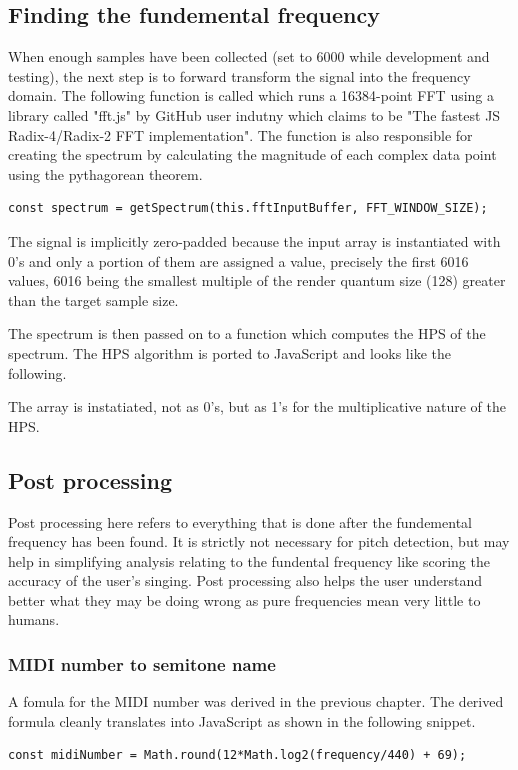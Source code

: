 \subsection{Finding the fundemental frequency}
When enough samples have been collected (set to 6000 while development and testing), the next step is to forward transform the signal into the frequency domain. The following function is called which runs a 16384-point FFT using a library called "fft.js" by GitHub user indutny which claims to be "The fastest JS Radix-4/Radix-2 FFT implementation". The function is also responsible for creating the spectrum by calculating the magnitude of each complex data point using the pythagorean theorem. 
\begin{lstlisting}[style=javascript]
    const spectrum = getSpectrum(this.fftInputBuffer, FFT_WINDOW_SIZE);
\end{lstlisting}
The signal is implicitly zero-padded because the input array is instantiated with 0's and only a portion of them are assigned a value, precisely the first 6016 values, 6016 being the smallest multiple of the render quantum size (128) greater than the target sample size.

The spectrum is then passed on to a function which computes the HPS of the spectrum. The HPS algorithm is ported to JavaScript and looks like the following. 

The array is instatiated, not as 0's, but as 1's for the multiplicative nature of the HPS.  

\subsection{Post processing}
Post processing here refers to everything that is done after the fundemental frequency has been found. It is strictly not necessary for pitch detection, but may help in simplifying analysis relating to the fundental frequency like scoring the accuracy of the user's singing. Post processing also helps the user understand better what they may be doing wrong as pure frequencies mean very little to humans. 

\subsubsection{MIDI number to semitone name}
A fomula for the MIDI number was derived in the previous chapter. The derived formula cleanly translates into JavaScript as shown in the following snippet.
\begin{lstlisting}[style=javascript]
    const midiNumber = Math.round(12*Math.log2(frequency/440) + 69);
\end{lstlisting}

